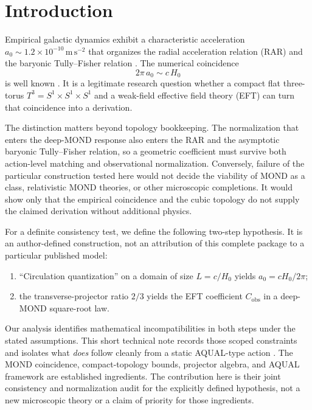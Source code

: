 \documentclass[aps,prd,reprint,superscriptaddress,nofootinbib,floatfix,showkeys]{revtex4-2}
\newcommand{\Tthree}{T^{3}}
\newcommand{\Cobs}{C_{\mathrm{obs}}}
\newcommand{\azero}{a_{0}}
\newcommand{\Hzero}{H_{0}}
\begin{document}

\maketitle

\section{Introduction}
\label{sec:intro}

Empirical galactic dynamics exhibit a characteristic acceleration
\(\azero\sim 1.2\times 10^{-10}\,\mathrm{m\,s^{-2}}\) that organizes the
radial acceleration relation (RAR) and the baryonic Tully--Fisher relation
\cite{mond,famaey_mcgaugh,mcgaugh_rar,lelli_rar}.
The numerical coincidence
\begin{equation}
  2\pi\,\azero \sim c\,\Hzero
  \label{eq:coincidence}
\end{equation}
is well known \cite{mond,famaey_mcgaugh}.  It is a legitimate research question
whether a compact flat three-torus \(\Tthree=S^{1}\times S^{1}\times S^{1}\)
\cite{lachieze_rey_luminet,planck_topology} and a weak-field effective field
theory (EFT) can turn that coincidence into a derivation.

The distinction matters beyond topology bookkeeping.  The normalization that
enters the deep-MOND response also enters the RAR and the asymptotic baryonic
Tully--Fisher relation, so a geometric coefficient must survive both
action-level matching and observational normalization.  Conversely, failure
of the particular construction tested here would not decide the viability of
MOND as a class, relativistic MOND theories, or other microscopic completions.
It would show only that the empirical coincidence and the cubic topology do
not supply the claimed derivation without additional physics.

For a definite consistency test, we define the following two-step hypothesis.
It is an author-defined construction, not an attribution of this complete
package to a particular published model:
\begin{enumerate}
\item[(A)] ``Circulation quantization'' on a domain of size \(L=c/\Hzero\)
  yields \(\azero=c\Hzero/2\pi\);
\item[(B)] the transverse-projector ratio \(2/3\) yields the EFT coefficient
  \(\Cobs\) in a deep-MOND square-root law.
\end{enumerate}
Our analysis identifies mathematical incompatibilities in both steps under the
stated assumptions.  This short technical note records those scoped
constraints and isolates what \emph{does} follow cleanly from a static
AQUAL-type action \cite{bekenstein_milgrom}.
The MOND coincidence, compact-topology bounds, projector algebra, and AQUAL
framework are established ingredients.  The contribution here is their joint
consistency and normalization audit for the explicitly defined hypothesis,
not a new microscopic theory or a claim of priority for those ingredients.
\end{document}
